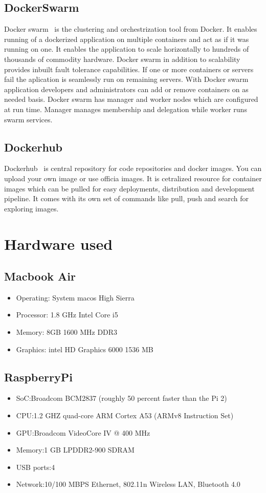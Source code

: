 \subsection{DockerSwarm}

Docker swarm~\cite{hid-sp18-413-dockerswarm} is the clustering and
orchestrization tool from Docker. It enables running of a dockerized
application on multiple containers and act as if it was running on
one. It enables the application to scale horizontally to hundreds of
thousands of commodity hardware. Docker swarm in addition to
scalability provides inbuilt fault tolerance capabilities. If one or
more containers or servers fail the aplication is seamlessly run on
remaining servers. With Docker swarm application developers and
administrators can add or remove containers on as needed basis. Docker
swarm has manager and worker nodes which are configured at run
time. Manager manages membership and delegation while worker runs
swarm services.

\subsection{Dockerhub}

Dockerhub~\cite{hid-sp18-413-dockerhub} is central repository for
code repositories and docker images. You can upload your own image or
use officia images. It is cetralized resource for container images
which can be pulled for easy deployments, distribution and development
pipeline. It comes with its own set of commands like pull, push and
search for exploring images.

\section{Hardware used}
\subsection{Macbook Air}
\begin{itemize}
\item Operating: System macos High Sierra
\item Processor: 1.8 GHz Intel Core i5
\item Memory: 8GB 1600 MHz DDR3
\item Graphics: intel HD Graphics 6000 1536 MB
\end{itemize}

\subsection{RaspberryPi}
\begin{itemize}
\item SoC:Broadcom BCM2837 (roughly 50 percent faster than the Pi 2)
\item CPU:1.2 GHZ quad-core ARM Cortex A53 (ARMv8 Instruction Set)
\item GPU:Broadcom VideoCore IV @ 400 MHz
\item Memory:1 GB LPDDR2-900 SDRAM
\item USB ports:4
\item Network:10/100 MBPS Ethernet, 802.11n Wireless LAN, Bluetooth
  4.0
\end{itemize}

